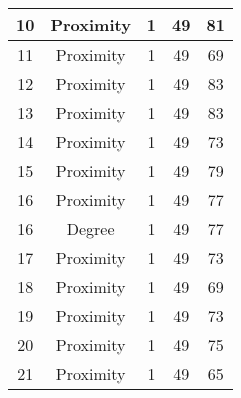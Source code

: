 \documentclass[results.tex]{subfiles}
\begin{document}
\begin{center}
\begin{tabular}{| c || c | c | c | c |}
            \hline
            10                      & Proximity                    & 1                      & 49                      & 81                   \\
            \hline
            11                      & Proximity                    & 1                      & 49                      & 69                   \\
            \hline
            12                      & Proximity                    & 1                      & 49                      & 83                   \\
            \hline
            13                      & Proximity                    & 1                      & 49                      & 83                   \\
            \hline
            14                      & Proximity                    & 1                      & 49                      & 73                   \\
            \hline
            15                      & Proximity                    & 1                      & 49                      & 79                   \\
            \hline
            16                      & Proximity                    & 1                      & 49                      & 77                   \\
            \hline
            16                      & Degree                       & 1                      & 49                      & 77                   \\
            \hline
            17                      & Proximity                    & 1                      & 49                      & 73                   \\
            \hline
            18                      & Proximity                    & 1                      & 49                      & 69                   \\
            \hline
            19                      & Proximity                    & 1                      & 49                      & 73                   \\
            \hline
            20                      & Proximity                    & 1                      & 49                      & 75                   \\
            \hline
            21                      & Proximity                    & 1                      & 49                      & 65                   \\

\end{tabular}
\end{center}
\end{document}
